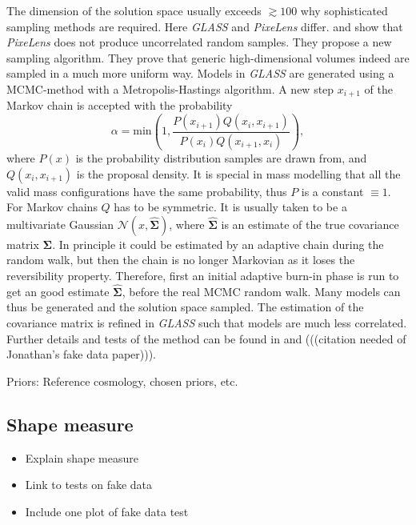 \documentclass[10pt]{article}
\begin{document}
The dimension of the solution space usually exceeds $\gtrsim100$ why sophisticated sampling methods are required. Here \textit{GLASS} and \textit{PixeLens} differ. \cite{2008ApJ...679...17C} and \cite{2012MNRAS.425.3077L} show that \textit{PixeLens} does not produce uncorrelated random samples. They propose a new sampling algorithm. They prove that generic high-dimensional volumes indeed are sampled in a much more uniform way. Models in \textit{GLASS} are generated using a MCMC-method with a Metropolis-Hastings algorithm. A new step $x_{i+1}$ of the Markov chain is accepted with the probability
\begin{equation}
\alpha = \mathrm{min}\left(1,\frac{P(x_{i+1})Q(x_{i},x_{i+1})}{P(x_{i})Q(x_{i+1},x_{i})}\right),
\end{equation}
where $P(x)$ is the probability distribution samples are drawn from, and $Q(x_{i},x_{i+1})$ is the proposal density. It is special in mass modelling that all the valid mass configurations have the same probability, thus $P$ is a constant $\equiv1$. For Markov chains $Q$ has to be symmetric. It is usually taken to be a multivariate Gaussian $\mathcal{N}(x,\hat{\boldsymbol\Sigma})$, where $\hat{\boldsymbol\Sigma}$ is an estimate of the true covariance matrix $\boldsymbol\Sigma$. In principle it could be estimated by an adaptive chain during the random walk, but then the chain is no longer Markovian as it loses the reversibility property. Therefore, first an initial adaptive burn-in phase is run to get an good estimate $\hat{\boldsymbol\Sigma}$, before the real MCMC random walk. Many models can thus be generated and the solution space sampled. The estimation of the covariance matrix is refined in \textit{GLASS} such that models are much less correlated. Further details and tests of the method can be found in \cite{2012MNRAS.425.3077L} and (((citation needed of Jonathan's fake data paper))).

Priors: Reference cosmology, chosen priors, etc.


\subsection{Shape measure}
\begin{itemize}
\item Explain shape measure
\item Link to tests on fake data
\item Include one plot of fake data test
\end{itemize}
\end{document}
